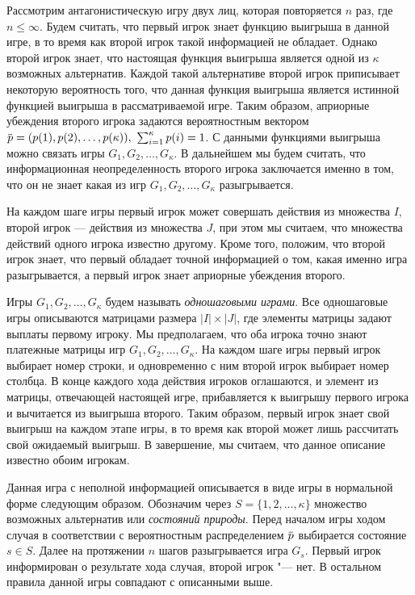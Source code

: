 Рассмотрим антагонистическую игру двух лиц, которая повторяется $n$ раз, где $n\leq \infty$.
Будем считать, что первый игрок знает функцию выигрыша в данной игре, в то время как второй игрок такой информацией не обладает.
Однако второй игрок знает, что настоящая функция выигрыша является одной из $\kappa$ возможных альтернатив.
Каждой такой альтернативе второй игрок приписывает некоторую вероятность того, что данная функция выигрыша является истинной функцией выигрыша в рассматриваемой
игре.
Таким образом, априорные убеждения второго игрока задаются вероятностным вектором
$\p = (p(1), p(2), \ldots, p(\kappa)),\ \sum_{i=1}^\kappa p(i) = 1$.
С данными функциями выигрыша можно связать игры $G_1, G_2, \ldots, G_\kappa$.
В дальнейшем мы будем считать, что информационная неопределенность второго игрока заключается именно в том, что он не знает какая из игр $G_1, G_2, \ldots, G_\kappa$ разыгрывается.

На каждом шаге игры первый игрок может совершать действия из множества $I$, второй игрок --- действия из множества $J$, при этом мы считаем, что множества действий одного игрока известно другому.
Кроме того, положим, что второй игрок знает, что первый обладает точной информацией о том, какая именно игра разыгрывается, а первый игрок знает априорные убеждения второго.

Игры $G_1, G_2, \ldots, G_\kappa$ будем называть \emph{одношаговыми играми}.
Все одношаговые игры описываются матрицами размера $|I| \times |J|$, где элементы матрицы задают выплаты первому игроку.
Мы предполагаем, что оба игрока точно знают платежные матрицы игр $G_1, G_2, \ldots, G_\kappa$.
На каждом шаге игры первый игрок выбирает номер строки, и одновременно с ним второй игрок выбирает номер столбца.
В конце каждого хода действия игроков оглашаются, и элемент из матрицы, отвечающей настоящей игре, прибавляется к выигрышу первого игрока и вычитается из выигрыша второго.
Таким образом, первый игрок знает свой выигрыш на каждом этапе игры, в то время как второй может лишь рассчитать свой ожидаемый выигрыш.
В завершение, мы считаем, что данное описание известно обоим игрокам.

Данная игра с неполной информацией описывается в виде игры в нормальной форме следующим образом.
Обозначим через $S = \{1, 2, \ldots, \kappa\}$ множество возможных альтернатив или \emph{состояний природы}.
Перед началом игры ходом случая в соответствии с вероятностным распределением $\p$ выбирается состояние $s \in S$.
Далее на протяжении $n$ шагов разыгрывается игра $G_s$.
Первый игрок информирован о результате хода случая, второй игрок "--- нет.
В остальном правила данной игры совпадают с описанными выше.

